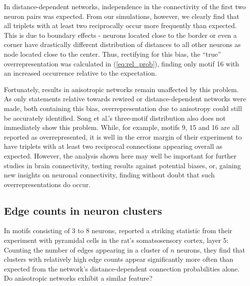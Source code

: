 In distance-dependent networks, independence in the connectivity
of the first two neuron pairs was expected. From
our simulations, however, we clearly find that all triplets with at
least two reciprocally occur more frequently than expected. This is
due to boundary effects - neurons located close to the border or even
a corner have drastically different distribution of distances to all
other neurons as node located close to the center. Thus, rectifying
for this bias, the \enquote{true} overrepresentation was calculated in
(\ref{eq:rel_prob}), finding only motif 16 with an increased
occurrence relative to the expectation.

Fortunately, results in anisotropic networks remain unaffected by this
problem. As only statements relative towards rewired or
distance-depen\-dent networks were made, both containing this bias,
overrepresentation due to anisotropy could still be accurately
identified. Song et al.'s three-motif distribution also does not
immediately show this problem. While, for example, motifs 9, 15 and 16
are all reported as overrepresented, it is well in the error margin of
their experiment to have triplets with at least two reciprocal
connections appearing overall as expected.  However, the analysis
shown here may well be important for further studies in brain
connectivity, testing results against potential biases, or, gaining
new insights on neuronal connectivity, finding without doubt that such
overrepresentations do occur.

 









\subsection*{Edge counts in neuron clusters}

In motifs consisting of 3 to 8 neurons, \textcite{Perin2011} reported
a striking statistic from their experiment with pyramidal cells in the
rat's somatsosensory cortex, layer 5: Counting the number of edges
appearing in a cluster of $n$ neurons, they find that clusters with
relatively high edge counts appear significantly more often than
expected from the network's distance-dependent connection
probabilities alone. Do anisotropic networks exhibit a similar
feature?

